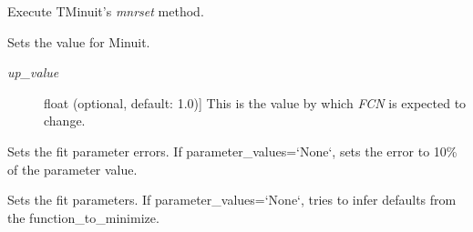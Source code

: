 \documentclass[a4paper,10pt,english]{sphinxmanual}
\begin{document}
\begin{fulllineitems}
\begin{fulllineitems}
\begin{description}
\end{description}

\end{fulllineitems}


\begin{fulllineitems}
\label{index:kafe.minuit.Minuit.reset}
Execute TMinuit's \emph{mnrset} method.

\end{fulllineitems}


\begin{fulllineitems}
\label{index:kafe.minuit.Minuit.set_err}
Sets the  value for Minuit.
\begin{description}
\item[{\emph{up\_value}}] \leavevmode{[}float (optional, default: 1.0){]}
This is the value by which \emph{FCN} is expected to change.

\end{description}

\end{fulllineitems}


\begin{fulllineitems}
\label{index:kafe.minuit.Minuit.set_parameter_errors}
Sets the fit parameter errors. If parameter\_values={}`None{}`, sets the
error to 10\% of the parameter value.

\end{fulllineitems}


\begin{fulllineitems}
\label{index:kafe.minuit.Minuit.set_parameter_names}
Sets the fit parameters. If parameter\_values={}`None{}`, tries to infer
defaults from the function\_to\_minimize.

\end{fulllineitems}



\end{fulllineitems}
\end{document}
